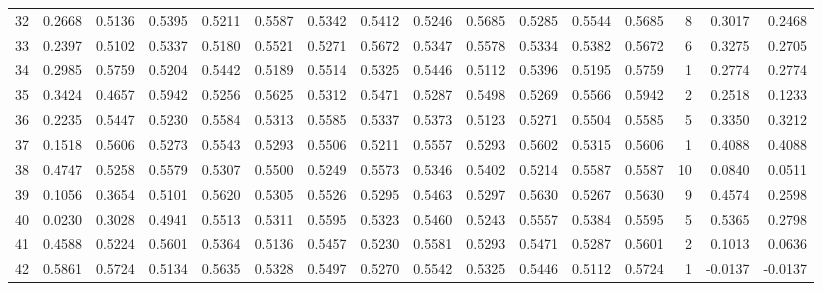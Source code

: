 \begin{tabular}{lrrrrrrrrrrrrrrr}
32  &      0.2668 &  0.5136 &  0.5395 &  0.5211 &  0.5587 &  0.5342 &  0.5412 &  0.5246 &  0.5685 &  0.5285 &   0.5544 &     0.5685 &      8 &                    0.3017 &                     0.2468 \\
33  &      0.2397 &  0.5102 &  0.5337 &  0.5180 &  0.5521 &  0.5271 &  0.5672 &  0.5347 &  0.5578 &  0.5334 &   0.5382 &     0.5672 &      6 &                    0.3275 &                     0.2705 \\
34  &      0.2985 &  0.5759 &  0.5204 &  0.5442 &  0.5189 &  0.5514 &  0.5325 &  0.5446 &  0.5112 &  0.5396 &   0.5195 &     0.5759 &      1 &                    0.2774 &                     0.2774 \\
35  &      0.3424 &  0.4657 &  0.5942 &  0.5256 &  0.5625 &  0.5312 &  0.5471 &  0.5287 &  0.5498 &  0.5269 &   0.5566 &     0.5942 &      2 &                    0.2518 &                     0.1233 \\
36  &      0.2235 &  0.5447 &  0.5230 &  0.5584 &  0.5313 &  0.5585 &  0.5337 &  0.5373 &  0.5123 &  0.5271 &   0.5504 &     0.5585 &      5 &                    0.3350 &                     0.3212 \\
37  &      0.1518 &  0.5606 &  0.5273 &  0.5543 &  0.5293 &  0.5506 &  0.5211 &  0.5557 &  0.5293 &  0.5602 &   0.5315 &     0.5606 &      1 &                    0.4088 &                     0.4088 \\
38  &      0.4747 &  0.5258 &  0.5579 &  0.5307 &  0.5500 &  0.5249 &  0.5573 &  0.5346 &  0.5402 &  0.5214 &   0.5587 &     0.5587 &     10 &                    0.0840 &                     0.0511 \\
39  &      0.1056 &  0.3654 &  0.5101 &  0.5620 &  0.5305 &  0.5526 &  0.5295 &  0.5463 &  0.5297 &  0.5630 &   0.5267 &     0.5630 &      9 &                    0.4574 &                     0.2598 \\
40  &      0.0230 &  0.3028 &  0.4941 &  0.5513 &  0.5311 &  0.5595 &  0.5323 &  0.5460 &  0.5243 &  0.5557 &   0.5384 &     0.5595 &      5 &                    0.5365 &                     0.2798 \\
41  &      0.4588 &  0.5224 &  0.5601 &  0.5364 &  0.5136 &  0.5457 &  0.5230 &  0.5581 &  0.5293 &  0.5471 &   0.5287 &     0.5601 &      2 &                    0.1013 &                     0.0636 \\
42  &      0.5861 &  0.5724 &  0.5134 &  0.5635 &  0.5328 &  0.5497 &  0.5270 &  0.5542 &  0.5325 &  0.5446 &   0.5112 &     0.5724 &      1 &                   -0.0137 &                    -0.0137 \\

\end{tabular}
